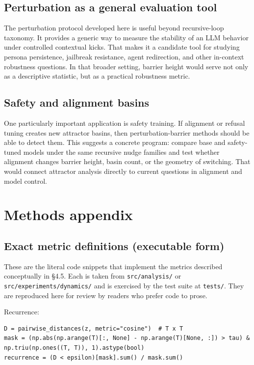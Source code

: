 \documentclass{article}
\theoremstyle{plain}
\theoremstyle{definition}
\begin{document}
\subsection{Perturbation as a general evaluation tool}

The perturbation protocol developed here is useful beyond
recursive-loop taxonomy. It provides a generic way to measure the
stability of an LLM behavior under controlled contextual kicks. That
makes it a candidate tool for studying persona persistence, jailbreak
resistance, agent redirection, and other in-context robustness
questions. In that broader setting, barrier height would serve not
only as a descriptive statistic, but as a practical robustness
metric.

\subsection{Safety and alignment basins}

One particularly important application is safety training. If
alignment or refusal tuning creates new attractor basins, then
perturbation-barrier methods should be able to detect them. This
suggests a concrete program: compare base and safety-tuned models
under the same recursive nudge families and test whether alignment
changes barrier height, basin count, or the geometry of switching.
That would connect attractor analysis directly to current questions
in alignment and model control.


\section{Methods appendix}

\subsection{Exact metric definitions (executable form)}

These are the literal code snippets that implement the metrics
described conceptually in §4.5. Each is taken from \texttt{src/analysis/}
or \texttt{src/experiments/dynamics/} and is exercised by the test suite at
\texttt{tests/}. They are reproduced here for review by readers who prefer
code to prose.

Recurrence:

\begin{verbatim}
D = pairwise_distances(z, metric="cosine")  # T x T
mask = (np.abs(np.arange(T)[:, None] - np.arange(T)[None, :]) > tau) & np.triu(np.ones((T, T)), 1).astype(bool)
recurrence = (D < epsilon)[mask].sum() / mask.sum()
\end{verbatim}
\end{document}
